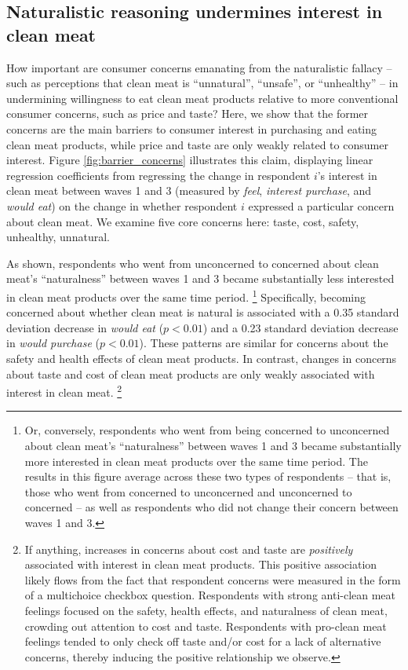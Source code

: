 \documentclass[12pt]{article}
\newcommand{\note}[1]{\textit{\textcolor{red}{$<$note$>$ #1 $<$/note$>$}}}
\begin{document}
\subsection{Naturalistic reasoning undermines interest in clean meat}


How important are consumer concerns emanating from the naturalistic fallacy -- such as perceptions that clean meat is ``unnatural'', ``unsafe'', or ``unhealthy'' -- in undermining willingness to eat clean meat products relative to more conventional consumer concerns, such as price and taste? Here, we show that the former concerns are the main barriers to consumer interest in purchasing and eating clean meat products, while price and taste are only weakly related to consumer interest. Figure \ref{fig:barrier_concerns} illustrates this claim, displaying linear regression coefficients from regressing the change in respondent $i$'s interest in clean meat between waves 1 and 3 (measured by \textit{feel}, \textit{interest purchase}, and \textit{would eat}) on the change in whether respondent $i$ expressed a particular concern about clean meat. We examine five core concerns here: taste, cost, safety, unhealthy, unnatural.

As shown, respondents who went from unconcerned to concerned about clean meat's ``naturalness'' between waves 1 and 3 became substantially less interested in clean meat products over the same time period.
\footnote{Or, conversely, respondents who went from being concerned to unconcerned about clean meat's ``naturalness'' between waves 1 and 3 became substantially more interested in clean meat products over the same time period. The results in this figure average across these two types of respondents -- that is, those who went from concerned to unconcerned and unconcerned to concerned -- as well as respondents who did not change their concern between waves 1 and 3.}
Specifically, becoming concerned about whether clean meat is natural is associated with a 0.35 standard deviation decrease in \textit{would eat} ($p < 0.01$) and a 0.23 standard deviation decrease in \textit{would purchase}  ($p < 0.01$). These patterns are similar for concerns about the safety and health effects of clean meat products. In contrast, changes in concerns about taste and cost of clean meat products are only weakly associated with interest in clean meat.
\footnote{If anything, increases in concerns about cost and taste are \textit{positively} associated with interest in clean meat products. This positive association likely flows from the fact that respondent concerns were measured in the form of a multichoice checkbox question. Respondents with strong anti-clean meat feelings focused on the safety, health effects, and naturalness of clean meat, crowding out attention to cost and taste. Respondents with pro-clean meat feelings tended to only check off taste and/or cost for a lack of alternative concerns, thereby inducing the positive relationship we observe.}
\end{document}
